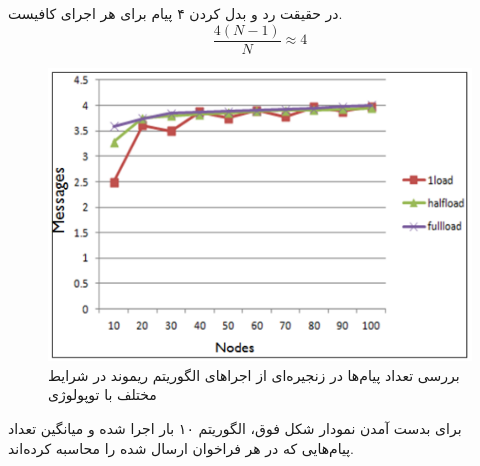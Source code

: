 \documentclass{article}
\begin{document}
\begin{multicols}{2}
در حقیقت رد و بدل کردن ۴ پیام برای هر اجرای
کافیست.
$$\frac{4(N-1)}{N} \approx 4$$
\begin{figure}[H]
    \centering
    \includegraphics[width=0.99\linewidth]{Photos/HW7/chart.png}
    \caption{
    بررسی تعداد پیام‌ها در زنجیره‌ای از اجراهای الگوریتم ریموند در شرایط مختلف با توپولوژی
    }
    \label{fig:my_label}
\end{figure}
برای بدست آمدن نمودار شکل فوق، الگوریتم ۱۰ بار اجرا شده و میانگین تعداد پیام‌هایی که در هر فراخوان
ارسال شده را محاسبه کرده‌اند.
\end{multicols}
\end{document}
